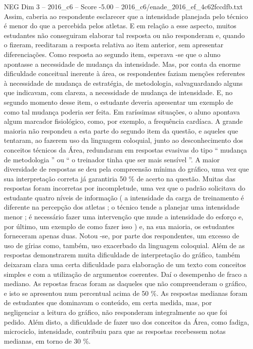 \begin{textsample}{NEG Dim 3 – 2016\_c6 – Score -5.00 – 2016\_c6/enade\_2016\_ef\_4c62fccdfb.txt}
Assim, caberia ao respondente esclarecer que a intensidade planejada pelo técnico é menor do que a percebida pelos atletas.
E em relação a esse aspecto, muitos estudantes não conseguiram elaborar tal resposta ou não responderam e, quando o fizeram, reeditaram a resposta relativa ao item anterior, sem apresentar diferenciações.
Como resposta ao segundo item, esperava -se que o aluno apontasse a necessidade de mudança da intensidade.
Mas, por conta da enorme dificuldade conceitual inerente à área, os respondentes faziam menções referentes à necessidade de mudança de estratégia, de metodologia, salvaguardando alguns que indicavam, com clareza, a necessidade de mudança de intensidade.
E, no segundo momento desse item, o estudante deveria apresentar um exemplo de como tal mudança poderia ser feita.
Em raríssimas situações, o aluno apontava algum marcador fisiológico, como, por exemplo, a frequência cardíaca.
A grande maioria não respondeu a esta parte do segundo item da questão, e aqueles que tentaram, ao fazerem uso da linguagem coloquial, junto ao desconhecimento dos conceitos técnicos da Área, redundaram em respostas evasivas do tipo “ mudança de metodologia ” ou “ o treinador tinha que ser mais sensível ”.
A maior diversidade de respostas se deu pela compreensão mínima do gráfico, uma vez que sua interpretação correta já garantiria 50 \% de acerto na questão.
Muitas das respostas foram incorretas por incompletude, uma vez que o padrão solicitava do estudante quatro níveis de informação ( a intensidade da carga de treinamento é diferente na percepção dos atletas ; o técnico tende a planejar uma intensidade menor ; é necessário fazer uma intervenção que mude a intensidade do esforço e, por último, um exemplo de como fazer isso ) e, na sua maioria, os estudantes forneceram apenas duas.
Notou -se, por parte dos respondentes, um excesso de uso de gírias como, também, uso exacerbado da linguagem coloquial.
Além de as respostas demonstrarem muita dificuldade de interpretação do gráfico, também deixaram clara uma certa dificuldade para elaboração de um texto com conceitos simples e com a utilização de argumentos coerentes.
Daí o desempenho de fraco a mediano.
As repostas fracas foram as daqueles que não compreenderam o gráfico, e isto se apresentou num percentual acima de 50 \%.
As respostas medianas foram de estudantes que dominavam o conteúdo, em certa medida, mas, por negligenciar a leitura do gráfico, não responderam integralmente ao que foi pedido.
Além disto, a dificuldade de fazer uso dos conceitos da Área, como fadiga, microciclo, intensidade, contribuiu para que as respostas recebessem notas medianas, em torno de 30 \%.

\end{textsample}
